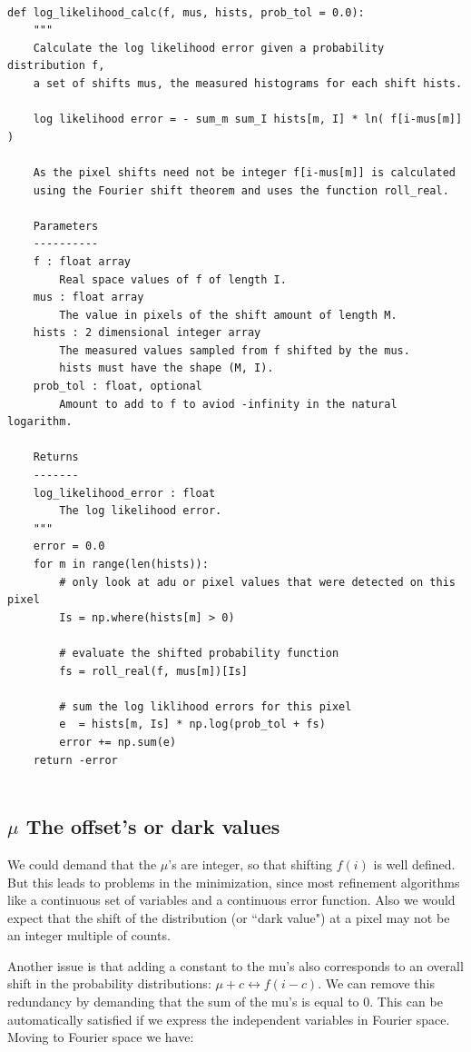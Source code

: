 \documentclass[11pt]{article}
\begin{document}
\begin{verbatim}

def log_likelihood_calc(f, mus, hists, prob_tol = 0.0):
    """
    Calculate the log likelihood error given a probability distribution f,
    a set of shifts mus, the measured histograms for each shift hists.
    
    log likelihood error = - sum_m sum_I hists[m, I] * ln( f[i-mus[m]] )
        
    As the pixel shifts need not be integer f[i-mus[m]] is calculated
    using the Fourier shift theorem and uses the function roll_real.
    
    Parameters
    ----------
    f : float array
        Real space values of f of length I.
    mus : float array
        The value in pixels of the shift amount of length M.
    hists : 2 dimensional integer array
        The measured values sampled from f shifted by the mus.
        hists must have the shape (M, I).
    prob_tol : float, optional
        Amount to add to f to aviod -infinity in the natural logarithm.
            
    Returns
    -------
    log_likelihood_error : float
        The log likelihood error.
    """
    error = 0.0
    for m in range(len(hists)):
        # only look at adu or pixel values that were detected on this pixel
        Is = np.where(hists[m] > 0)
        
        # evaluate the shifted probability function
        fs = roll_real(f, mus[m])[Is] 

        # sum the log liklihood errors for this pixel
        e  = hists[m, Is] * np.log(prob_tol + fs)
        error += np.sum(e)
    return -error


\end{verbatim}

\subsection{$\mu$ The offset's or dark values}
We could demand that the $\mu$'s are integer, so that shifting $f(i)$ is well defined. But this leads to problems in the minimization, since most refinement algorithms like a continuous set of variables and a continuous error function. Also we would expect that the shift of the distribution (or ``dark value") at a pixel may not be an integer multiple of counts. 

Another issue is that adding a constant to the mu's also corresponds to an overall shift in the probability distributions: $\mu + c \longleftrightarrow  f(i - c)$. We can remove this redundancy by demanding that the sum of the mu's is equal to 0. This can be automatically satisfied if we express the independent variables in Fourier space. Moving to Fourier space we have:
\end{document}
